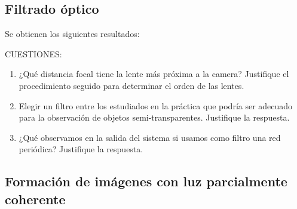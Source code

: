 \documentclass{./packages/optica-article}
\begin{document}
\subsection{Filtrado óptico}
Se obtienen los siguientes resultados:


CUESTIONES:
\begin{enumerate}
\item ¿Qué distancia focal tiene la lente más próxima a la camera? Justifique el procedimiento seguido para determinar el orden de las lentes.
\item Elegir un filtro entre los estudiados en la práctica que podría ser adecuado para la observación de objetos semi-transparentes. Justifique la respuesta.
\item ¿Qué observamos en la salida del sistema si usamos como filtro una red periódica? Justifique la respuesta.
\end{enumerate}


\subsection{Formación de imágenes con luz parcialmente coherente}
\end{document}
